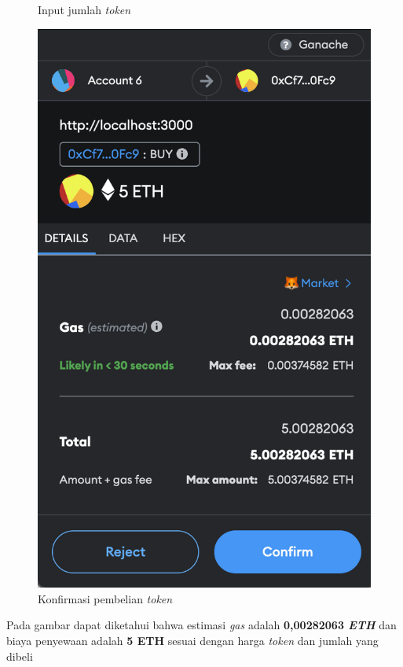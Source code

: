 \begin{itemize}
\begin{figure} [H]
            \caption{Input jumlah \emph{token}}
            \label{fig:TestShareInputRentalPeriodToken}
        \end{figure}
        \begin{figure} [H] \centering
            \includegraphics[scale=0.4]{gambar/img-test-share-buy-2.png}
            \caption{Konfirmasi pembelian \emph{token}}
            \label{fig:TestShareConfirmationBuyToken}
        \end{figure}
        Pada gambar dapat diketahui bahwa estimasi \emph{gas} adalah \textbf{0,00282063 \emph{ETH}} dan biaya penyewaan adalah \textbf{5 ETH} sesuai dengan harga \emph{token} dan jumlah yang dibeli

\end{itemize}
